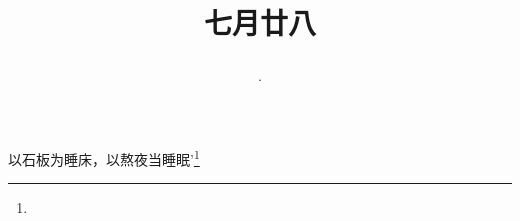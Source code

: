 \title{\date[d=31,m=8,y=2024][year:cn-y,年,month:cn,day:cn,日,·,weekday]·七月廿八 }
以石板为睡床，以熬夜当睡眠’\footnote{ }

